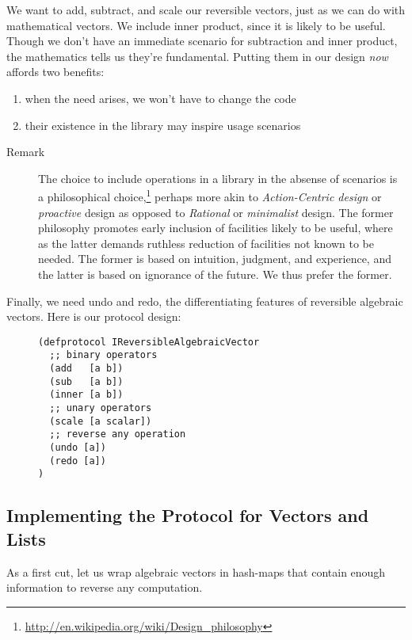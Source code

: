 \documentclass[11pt]{article}
\begin{document}
We want to add, subtract, and scale our reversible vectors, just as we
can do with mathematical vectors. We include inner product, since it
is likely to be useful. Though we don't have an immediate scenario for
subtraction and inner product, the mathematics tells us they're
fundamental. Putting them in our design \emph{now} affords two benefits:
\begin{enumerate}
\item when the need arises, we won't have to change the code
\item their existence in the library may inspire usage scenarios
\end{enumerate}



\begin{description}
\item[{Remark}] The choice to include operations in a library in the absense
of scenarios is a philosophical
choice,\footnote{\url{http://en.wikipedia.org/wiki/Design_philosophy}}
perhaps more akin to \emph{Action-Centric design} or \emph{proactive}
design as opposed to \emph{Rational} or \emph{minimalist} design. The
former philosophy promotes early inclusion of facilities
likely to be useful, where as the latter demands ruthless
reduction of facilities not known to be needed. The former
is based on intuition, judgment, and experience, and the
latter is based on ignorance of the future. We thus prefer
the former.
\end{description}



Finally, we need undo and redo, the differentiating features of
reversible algebraic vectors. Here is our protocol design:

\begin{figure}[H]
\label{reversible-algebraic-vector-protocol}
\begin{verbatim}
(defprotocol IReversibleAlgebraicVector
  ;; binary operators
  (add   [a b])
  (sub   [a b])
  (inner [a b])
  ;; unary operators
  (scale [a scalar])
  ;; reverse any operation
  (undo [a])
  (redo [a])
)
\end{verbatim}
\end{figure}

\subsection{Implementing the Protocol for Vectors and Lists}
\label{sec-3-1}

As a first cut, let us wrap algebraic vectors in hash-maps that contain
enough information to reverse any computation.
\end{document}
